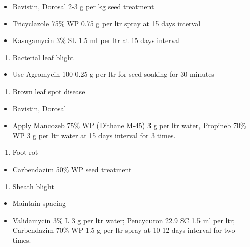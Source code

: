 \documentclass[]{book}
\providecommand{\tightlist}{%
  \setlength{\itemsep}{0pt}\setlength{\parskip}{0pt}}
\begin{document}
\begin{itemize}
\tightlist
\item
  Bavistin, Dorosal 2-3 g per kg seed treatment
\item
  Tricyclazole 75\% WP 0.75 g per ltr spray at 15 days interval
\item
  Kasugamycin 3\% SL 1.5 ml per ltr at 15 days interval
\end{itemize}

\begin{enumerate}
\def\labelenumi{\arabic{enumi}.}
\setcounter{enumi}{1}
\tightlist
\item
  Bacterial leaf blight
\end{enumerate}

\begin{itemize}
\tightlist
\item
  Use Agromycin-100 0.25 g per ltr for seed soaking for 30 minutes
\end{itemize}

\begin{enumerate}
\def\labelenumi{\arabic{enumi}.}
\setcounter{enumi}{2}
\tightlist
\item
  Brown leaf spot disease
\end{enumerate}

\begin{itemize}
\tightlist
\item
  Bavistin, Dorosal
\item
  Apply Mancozeb 75\% WP (Dithane M-45) 3 g per ltr water, Propineb 70\% WP 3 g per ltr water at 15 days interval for 3 times.
\end{itemize}

\begin{enumerate}
\def\labelenumi{\arabic{enumi}.}
\setcounter{enumi}{3}
\tightlist
\item
  Foot rot
\end{enumerate}

\begin{itemize}
\tightlist
\item
  Carbendazim 50\% WP seed treatment
\end{itemize}

\begin{enumerate}
\def\labelenumi{\arabic{enumi}.}
\setcounter{enumi}{4}
\tightlist
\item
  Sheath blight
\end{enumerate}

\begin{itemize}
\tightlist
\item
  Maintain spacing
\item
  Validamycin 3\% L 3 g per ltr water; Pencycuron 22.9 SC 1.5 ml per ltr; Carbendazim 70\% WP 1.5 g per ltr spray at 10-12 days interval for two times.
\end{itemize}
\end{document}
